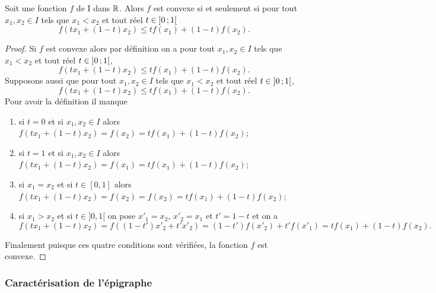 \begin{theo}
  Soit une fonction \(f\) de I dans \(\mathbb{R}\). Alors \(f\) est convexe si et 
  seulement si pour tout \(x_1, x_2 \in I\) tels que \(x_1 < x_2\) et tout réel 
  \(t \in \left] 0 \, ;  1 \right[\)
  \begin{equation}
    f(tx_1+(1-t)x_2) \leqslant tf(x_1)+(1-t)f(x_2).
  \end{equation}
\end{theo}
\begin{proof}
  Si \(f\) est convexe alors par définition on a pour tout \(x_1, x_2 \in I\) 
  tels que \(x_1 < x_2\) et tout réel \(t \in \left] 0 \, ;  1 \right[\),
  \begin{equation}
    f(tx_1+(1-t)x_2) \leqslant tf(x_1)+(1-t)f(x_2).
  \end{equation}
  Supposons aussi que pour tout \(x_1, x_2 \in I\) tels que \(x_1 < x_2\) et 
  tout réel \(t \in \left] 0 \, ;  1 \right[\),
  \begin{equation}
    f(tx_1+(1-t)x_2) \leqslant tf(x_1)+(1-t)f(x_2).
  \end{equation}
  Pour avoir la définition il manque
  \begin{enumerate}
    \item si \(t=0\) et si \(x_1, x_2 \in I\) alors 
      \(f(tx_1+(1-t)x_2)=f(x_2)=tf(x_1)+(1-t)f(x_2)\);
    \item si \(t=1\) et si \(x_1, x_2 \in I\) alors 
      \(f(tx_1+(1-t)x_2)=f(x_1)=tf(x_1)+(1-t)f(x_2)\);
    \item si \(x_1=x_2\) et si \(t \in [0,1]\) alors 
      \(f(tx_1+(1-t)x_2)=f(x_2)=f(x_2)=tf(x_1)+(1-t)f(x_2)\);
    \item si \(x_1>x_2\) et si \(t \in ]0,1[\) on pose \(x'_1=x_2\), 
      \(x'_2=x_1\) et \(t'=1-t\) et on a
      \begin{equation}
        f(tx_1+(1-t)x_2) = f((1-t')x'_2+t'x'_2) = (1-t')f(x'_2) + t'f(x'_1) = 
        tf(x_1)+(1-t)f(x_2).
      \end{equation}
  \end{enumerate}
  Finalement puisque ces quatre conditions sont vérifiées, la fonction \(f\) est 
  convexe.
\end{proof}

\subsubsection{Caractérisation de l'épigraphe}

